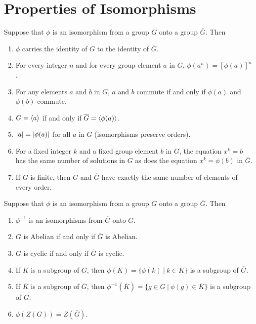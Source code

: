 \section{Properties of Isomorphisms}

\begin{theorem}
	Suppose that $\phi$ is an isomorphism from a group $G$ onto a group $\overline{G}$. Then
	\begin{enumerate}
		\item $\phi$ carries the identity of $G$ to the identity of $\overline{G}$.
		\item For every integer $n$ and for every group element $a$ in $G$, $\phi(a^n)=[\phi(a)]^n$.
		\item For any elements $a$ and $b$ in $G$, $a$ and $b$ commute if and only if $\phi(a)$ and $\phi(b)$ commute.
		\item $G = \langle a \rangle$ if and only if $\overline{G} = \langle \phi(a) \rangle$.
		\item $\left\lvert a \right\rvert=\left\lvert \phi(a) \right\rvert$ for all $a$ in $G$ (isomorphisms preserve orders).
		\item For a fixed integer $k$ and a fixed group element $b$ in $G$, the equation $x^k=b$ has the same number of solutions in $G$ as does the equation $x^k = \phi(b)$ in $\overline{G}$.
		\item If $G$ is finite, then $G$ and $\overline{G}$ have exactly the same number of elements of every order.
	\end{enumerate}
\end{theorem}

\begin{theorem}
	Suppose that $\phi$ is an isomorphism from a group $G$ onto a group $\overline{G}$. Then
	\begin{enumerate}
		\item $\phi^{-1}$ is an isomorphisms from $\overline{G}$ onto $G$.
		\item $G$ is Abelian if and only if $\overline{G}$ is Abelian.
		\item $G$ is cyclic if and only if $\overline{G}$ is cyclic.
		\item If $K$ is a subgroup of $G$, then $\phi(K) = \{\phi(k)\ \vert\ k \in K\}$ is a subgroup of $\overline{G}$.
		\item If $\overline{K}$ is a subgroup of $\overline{G}$, then $\phi^{-1}(\overline{K}) = \{g \in G\ \vert\ \phi(g) \in \overline{K}\}$ is a subgroup of $G$.
		\item $\phi(Z(G))=Z(\overline{G})$.
	\end{enumerate}
\end{theorem}
